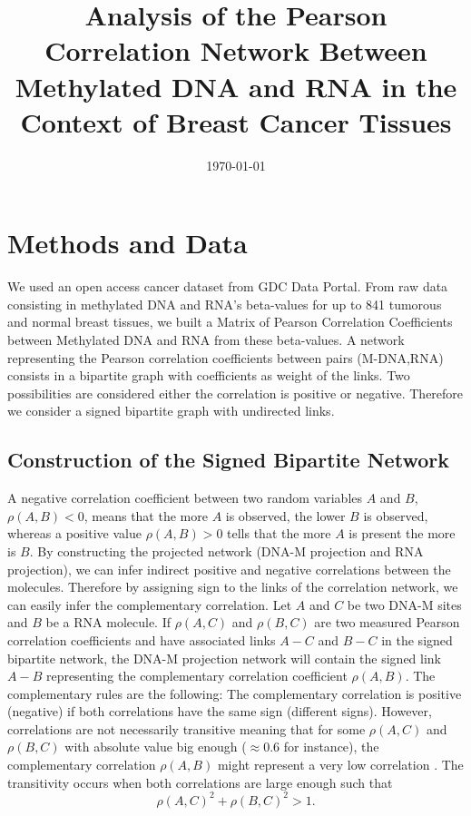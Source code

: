 \documentclass[10pt,a4paper]{article}
\title{Analysis of the Pearson Correlation Network Between Methylated DNA and RNA in the Context of Breast Cancer Tissues}
\date{\today}
\begin{document}
\maketitle
\section{Methods and Data}
We used an open access cancer dataset from GDC Data Portal. From raw data consisting in methylated DNA and RNA's beta-values for up to 841 tumorous and normal breast tissues, we built a Matrix of Pearson Correlation Coefficients between Methylated DNA and RNA from these beta-values. A network representing the Pearson correlation coefficients between pairs (M-DNA,RNA) consists in a bipartite graph with coefficients as weight of the links. Two possibilities are considered either the correlation is positive or negative. Therefore we consider a signed bipartite graph with undirected links.
\subsection{Construction of the Signed Bipartite Network}
A negative correlation coefficient between two random variables $A$ and $B$, $\rho(A,B)<0$, means that the more $A$ is observed, the lower $B$ is observed, whereas a positive value $\rho(A,B)>0$ tells that the more $A$ is present the more is $B$. By constructing the projected network (DNA-M projection and RNA projection), we can infer indirect positive and negative correlations between the molecules. Therefore by assigning sign to the links of the correlation network, we can easily infer the complementary correlation. Let $A$ and $C$ be two DNA-M sites and $B$ be a RNA molecule. If $\rho(A,C)$ and $\rho(B,C)$ are two measured Pearson correlation coefficients and have associated links $A-C$ and $B-C$ in the signed bipartite network, the DNA-M projection network will contain the signed link $A-B$ representing the complementary correlation coefficient $\rho(A,B)$. The complementary rules are the following: The complementary correlation is positive (negative) if both correlations have the same sign (different signs). However, correlations are not necessarily transitive meaning that for some $\rho(A,C)$ and $\rho(B,C)$ with absolute value big enough ($\approx 0.6$ for instance), the complementary correlation $\rho(A,B)$ might represent a very low correlation \cite{langford12}. The transitivity occurs when both correlations are large enough such that
\begin{equation}
\rho(A,C)^{2} + \rho(B,C)^{2} > 1.
\label{eq:transitivy}
\end{equation}
\end{document}
